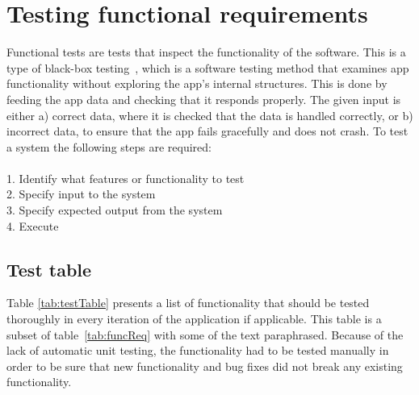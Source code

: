 \newpage
\section{Testing functional requirements}
\label{sec:funcTest}
Functional tests are tests that inspect the functionality of the software. This is a type of black-box testing~\cite{blackbox}, which is a software testing method that examines app functionality without exploring the app's internal structures. This is done by feeding the app data and checking that it responds properly. The given input is either a) correct data, where it is checked that the data is handled correctly, or b) incorrect data, to ensure that the app fails gracefully and does not crash. To test a system the following steps are required:\\\\
1. Identify what features or functionality to test\\
2. Specify input to the system\\
3. Specify expected output from the system\\
4. Execute

\subsection{Test table}
Table \ref{tab:testTable} presents a list of functionality that should be tested thoroughly in every iteration of the application if applicable. This table is a subset of table~\ref{tab:funcReq} with some of the text paraphrased. Because of the lack of automatic unit testing, the functionality had to be tested manually in order to be sure that new functionality and bug fixes did not break any existing functionality.

